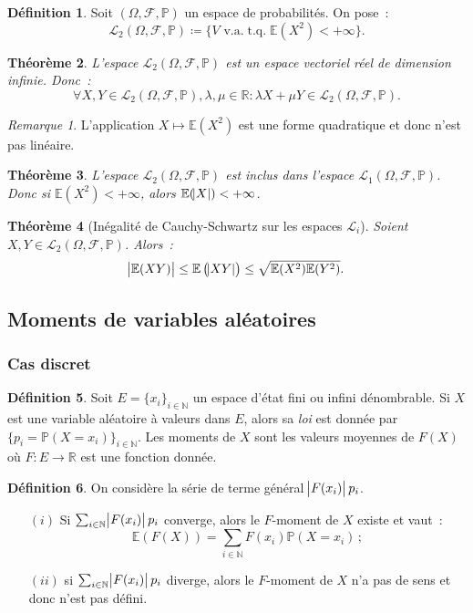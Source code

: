 \documentclass{article}
\newcommand{\E}{\mathbb E}
\newcommand{\N}{\mathbb N}
\renewcommand{\P}{\mathbb P}
\newcommand{\R}{\mathbb R}
\newcommand{\espproba}[3]{\left(#1, #2, #3\right)}  %
\newcommand{\Ofp}{\espproba \Omega{\mathcal F}\P}  %
\newcommand{\Lu}{\mathcal L_1\Ofp}  %
\newcommand{\Ld}{\mathcal L_2\Ofp}  %
\DeclareMathOperator{\tq}{t.q.}
\newtheorem{thm}{Théorème}[section]
\theoremstyle{definition}
\newtheorem{déf}[thm]{Définition}
\theoremstyle{remark}
\newtheorem*{rmq}{Remarque}
\begin{document}
		\begin{déf} Soit $\Ofp$ un espace de probabilités. On pose~:
		\[\Ld \coloneqq \{V \text{ v.a.} \tq \E(X^2) < +\infty\}.\]
		\end{déf}

		\begin{thm} L'espace $\Ld$ est un espace vectoriel réel de dimension infinie. Donc~:
		\[\forall X, Y \in \Ld, \lambda, \mu \in \R : \lambda X + \mu Y \in \Ld.\]
		\end{thm}

		\begin{rmq} L'application $X \mapsto \E(X^2)$ est une forme quadratique et donc n'est pas linéaire. \end{rmq}

		\begin{thm} L'espace $\Ld$ est inclus dans l'espace $\Lu$. Donc si $\E(X^2) < +\infty$, alors $\E(\abs X) < +\infty$. \end{thm}

		\begin{thm}[Inégalité de Cauchy-Schwartz sur les espaces $\mathcal L_i$] Soient $X, Y \in \Ld$. Alors~:
		\begin{equation}\label{eq:C-SL2}
			\abs {\E(XY)} \leq \E\left(\abs {XY}\right) \leq \sqrt{\E(X^2)\E(Y^2)}.
		\end{equation}
		\end{thm}

	\subsection{Moments de variables aléatoires}
		\subsubsection{Cas discret}
		\begin{déf} Soit $E = \{x_i\}_{i \in \N}$ un espace d'état fini ou infini dénombrable. Si $X$ est une variable aléatoire à valeurs dans $E$, alors sa
		\emph{loi} est donnée par $\{p_i = \P(X = x_i)\}_{i \in \N}$. Les moments de $X$ sont les valeurs moyennes de $F(X)$ où $F : E \to \R$ est une fonction
		donnée. \end{déf}

		\begin{déf} On considère la série de terme général $\abs {F(x_i)}p_i$.

		\begin{itemize}
			\item[$(i)$] Si $\sum_{i \in \N}\abs{F(x_i)}p_i$ converge, alors le $F$-moment de $X$ existe et vaut~:
			             \[\E(F(X)) = \sum_{i \in \N}F(x_i)\P(X=x_i)\,;\]
			\item[$(ii)$] si $\sum_{i \in \N}\abs{F(x_i)}p_i$ diverge, alors le $F$-moment de $X$ n'a pas de sens et donc n'est pas défini.
		\end{itemize}
		\end{déf}
\end{document}
